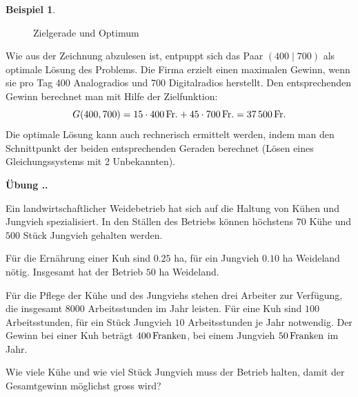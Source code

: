 \documentclass[%
11pt,%
twoside,%
titlepage,%
swissgerman,%
headsepline%
]{scrartcl}
\newcommand{\faEyeLightGray}{\textcolor{lightgray}{\faEye}} %
\theoremstyle{definition}
\newtheorem{bsp}{Beispiel}[subsection] %
\theoremstyle{plain}
\newcommand{\concatueb}[1]{ueb:#1}%
\newcommand{\concatlsg}[1]{lsg:#1}%
\newcounter{uebcounter}[section]
\renewcommand{\theuebcounter}{\thesection.\arabic{uebcounter}}  %
\newenvironment{uebenv}[1]{%
    \refstepcounter{uebcounter}
    \par\noindent\textbf{Übung \theuebcounter.}%
    \label{\concatueb{#1}}\hfill\hyperref[\concatlsg{#1}]{\faEyeLightGray}\par
}{%
    \par
}
\begin{document}
\begin{bsp}
\begin{figure}[h!]
\begin{center}
{
}
\end{center}
\caption{Zielgerade und Optimum}
\end{figure}
Wie aus der Zeichnung abzulesen ist, entpuppt sich das Paar $(400\mid 700)$ als optimale Lösung des Problems. Die Firma erzielt einen maximalen Gewinn, wenn sie pro Tag 400 Analogradios und 700 Digitalradios herstellt. Den entsprechenden Gewinn berechnet man mit Hilfe der Zielfunktion:
$$G(400,700) = \unit[15\cdot400]{Fr.} + \unit[45\cdot700]{Fr.} = \unit[37\,500]{Fr.}$$
Die optimale Lösung kann auch rechnerisch ermittelt werden, indem man den Schnittpunkt der beiden entsprechenden Geraden berechnet (Lösen eines Gleichungssystems mit 2 Unbekannten).
\end{bsp}

\begin{uebenv}{weidebetrieb}
  Ein landwirtschaftlicher Weidebetrieb hat sich auf die Haltung von
  Kühen und Jungvieh spezialisiert. In den Ställen des Betriebs
  können höchstens $70$ Kühe und $500$ Stück Jungvieh gehalten
  werden.

  Für die Ernährung einer Kuh sind $0.25$ ha, für ein
  Jungvieh $0.10$ ha Weideland nötig. Insgesamt hat der Betrieb $50$
  ha Weideland.

  Für die Pflege der Kühe und des Jungviehs stehen drei
  Arbeiter zur Verfügung, die insgesamt $8000$ Arbeitsstunden im
  Jahr leisten. Für eine Kuh sind $100$ Arbeitsstunden, für ein
  Stück Jungvieh $10$ Arbeitsstunden je Jahr notwendig. Der Gewinn
  bei einer Kuh beträgt $\unit[400]{Franken}$, bei einem Jungvieh $\unit[50]{Franken}$ im
  Jahr.

  Wie viele Kühe und wie viel Stück Jungvieh muss der
  Betrieb halten, damit der Gesamtgewinn möglichst gross wird?
\end{uebenv}
\end{document}
